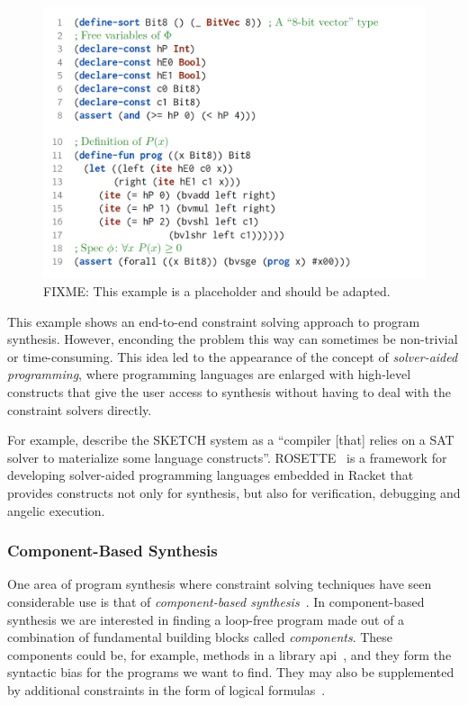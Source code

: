 \begin{figure}[h!]
  \centering
  \includegraphics[width=\textwidth]{assets/constraint-solving-smtlib.png}
  \caption{FIXME: This example is a placeholder and should be adapted.}
\end{figure}

This example shows an end-to-end constraint solving approach to program
synthesis. However, enconding the problem this way can sometimes be non-trivial
or time-consuming. This idea led to the appearance of the concept of
\textit{solver-aided programming}, where programming languages are enlarged with
high-level constructs that give the user access to synthesis without having to
deal with the constraint solvers directly.

For example, \citeauthor{Gulwani2017} describe the SKETCH system as a ``compiler
[that] relies on a SAT solver to materialize some language constructs''.
ROSETTE~\cite{Torlak:2013:GSL} is a framework for developing solver-aided
programming languages embedded in Racket that provides constructs not only for
synthesis, but also for verification, debugging and angelic execution.

\subsubsection{Component-Based Synthesis}
\label{sec:components}

One area of program synthesis where constraint solving techniques have seen
considerable use is that of \textit{component-based
synthesis}~\cite{Shi:2019:FCS,Feng:2018:PSU,Feng:2017:CST,Feng:2017:CSC,Jha:oracle:2010}.
In component-based synthesis we are interested in finding a loop-free program
made out of a combination of fundamental building blocks called
\textit{components}. These components could be, for example, methods in a
library \gls{api}~\cite{Shi:2019:FCS,Feng:2017:CSC}, and they form the syntactic
bias for the programs we want to find. They may also be supplemented by
additional constraints in the form of logical formulas~\cite{Feng:2018:PSU}.
